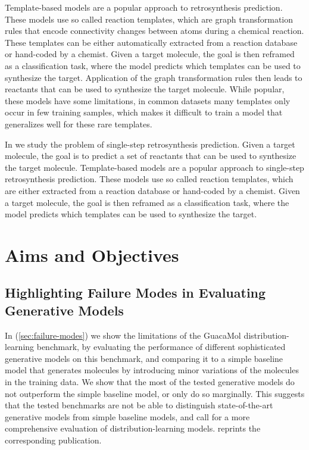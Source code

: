 Template-based models are a popular approach to retrosynthesis prediction. These
models use so called reaction templates, which are graph transformation rules 
that encode connectivity changes between atoms during a chemical reaction. These 
templates can be either automatically extracted from a reaction database or
hand-coded by a chemist. Given a target molecule, the goal is then reframed as a
classification task, where the model predicts which templates can be used to
synthesize the target. Application of the graph transformation rules then leads
to reactants that can be used to synthesize the target molecule. While popular, 
these models have some limitations, in common datasets many templates only occur 
in few training samples, which makes it difficult to train a model that generalizes
well for these rare templates.

In \citep{seidlImprovingFewZeroShot2022} we study the problem of single-step
retrosynthesis prediction. Given a target molecule, the goal is to predict a
set of reactants that can be used to synthesize the target molecule.
Template-based models are a popular approach to single-step retrosynthesis
prediction. These models use so called reaction templates, which are
either extracted from a reaction database or hand-coded by a chemist.
Given a target molecule, the goal is then reframed as a classification task,
where the model predicts which templates can be used to synthesize the target.



\section{Aims and Objectives\label{sec:aims-objectives}}
\subsection{Highlighting Failure Modes in Evaluating Generative Models}
In \citep{renzFailureModesMolecule2019} (\cref{sec:failure-modes}) we show the
limitations of the GuacaMol distribution-learning benchmark, by evaluating the
performance of different sophisticated generative models on this benchmark, and
comparing it to a simple baseline model that generates molecules by introducing
minor variations of the molecules in the training data. We show that the 
most of the tested generative models do not outperform the simple baseline
model, or only do so marginally. This suggests that the tested benchmarks
are not be able to distinguish state-of-the-art generative models 
from simple baseline models, and call for a more comprehensive evaluation of
distribution-learning models.  reprints
the corresponding publication.

